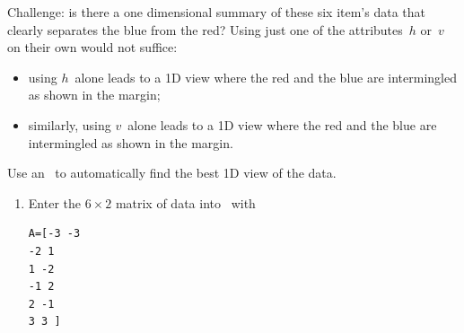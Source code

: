 \begin{example}
Challenge: is there a one dimensional summary of these six item's data that clearly separates the blue from the red?
Using just one of the attributes~\(h\) or~\(v\) on their own would not suffice:
\begin{itemize}
\item using \(h\)~alone leads to a 1D view where the red and the blue are intermingled as shown in the margin;

\item similarly, using \(v\)~alone leads to a 1D view where the red and the blue are intermingled as shown in the margin.
\end{itemize}

\begin{solution} 
Use an \svd\ to automatically find the best 1D view of the data.
\begin{enumerate}
\item Enter the \(6\times2\) matrix of data into \script\ with
\begin{verbatim}
A=[-3 -3
-2 1
1 -2
-1 2
2 -1
3 3 ]
\end{verbatim}
\setbox\ajrqrbox\hbox{}%
\marginpar{\usebox{\ajrqrbox\\[2ex]}}%


\end{enumerate}
\end{solution}
\end{example}
